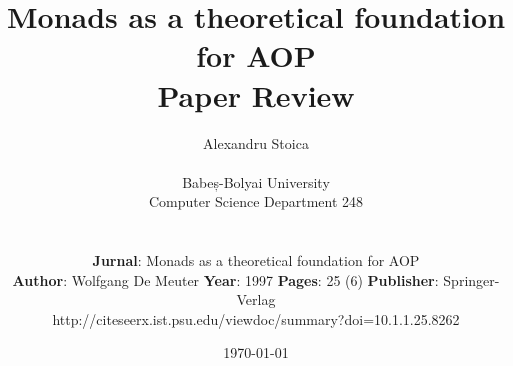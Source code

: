 
\title{Monads as a theoretical foundation for AOP \\ Paper Review}
\date{\today} 
\author{Alexandru Stoica \\\\
Babeș-Bolyai University \\ 
Computer Science Department 248 \\\\\\ \vspace{2mm}
\textbf{Jurnal}: Monads as a theoretical foundation for AOP \\\vspace{2mm}
\textbf{Author}: Wolfgang De Meuter
\textbf{Year}: 1997 
\textbf{Pages}: 25 (6) 
\textbf{Publisher}: Springer-Verlag \\ \vspace{2mm}
http://citeseerx.ist.psu.edu/viewdoc/summary?doi=10.1.1.25.8262
}

